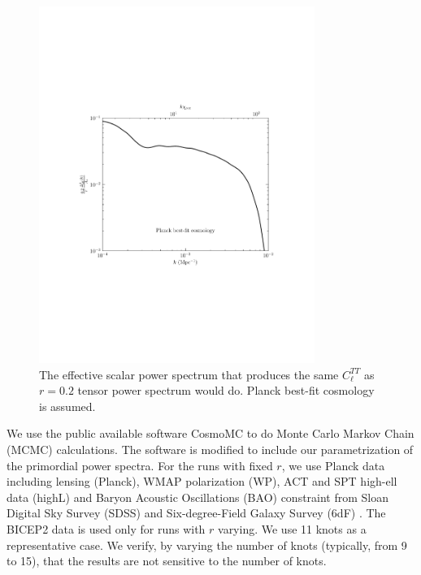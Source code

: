 \documentclass[11pt]{article}
\def \figwidth{0.8\textwidth}
\begin{document}
\begin{figure}
  \includegraphics[width = \figwidth, trim = 1in 2.9in 1in 2.9in]{ten_eff_ps.pdf}
  \caption{The effective scalar power spectrum that produces the same $C_\ell^{TT}$ as $r=0.2$ tensor power spectrum would do. Planck best-fit cosmology is assumed. \label{fig:effps}}
\end{figure}


We use the public available software CosmoMC \cite{CosmoMC} to do Monte Carlo Markov Chain (MCMC) calculations. The software is modified to include our parametrization of the primordial power spectra. For the runs with fixed $r$, we use Planck data including lensing (Planck), WMAP polarization (WP), ACT and SPT high-ell data (highL) and Baryon Acoustic Oscillations (BAO) constraint from Sloan Digital Sky Survey (SDSS) \cite{SDSSDR9} and Six-degree-Field Galaxy Survey (6dF) \cite{Jones2004, Jones2009}. The BICEP2 data is used only for runs with $r$ varying. We use 11 knots as a representative case. We verify, by varying the number of knots (typically, from 9 to 15), that the results are not sensitive to the number of knots.
\end{document}
